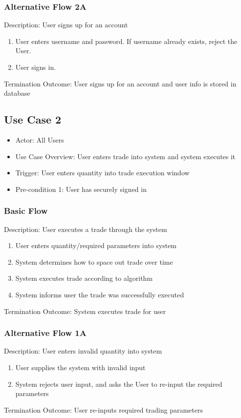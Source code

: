 \documentclass{article}
\begin{document}
\subsubsection{Alternative Flow 2A}
Description: User signs up for an account
\begin{enumerate}
\item User enters username and password. If username already exists, reject the User.
\item User signs in. 
\end{enumerate}
Termination Outcome: User signs up for an account and user info is stored in database

\subsection{Use Case 2}
\begin{itemize}
\item Actor: All Users
\item Use Case Overview:  User enters trade into system and system executes it
\item Trigger: User enters quantity into trade execution window
\item Pre-condition 1: User has securely signed in
\end{itemize}

\subsubsection{Basic Flow}
Description: User executes a trade through the system
\begin{enumerate}
\item User enters quantity/required parameters into system
\item System determines how to space out trade over time
\item System executes trade according to algorithm
\item System informs user the trade was successfully executed
\end{enumerate}
Termination Outcome: System executes trade for user

\subsubsection{Alternative Flow 1A}
Description: User enters invalid quantity into system
\begin{enumerate}
\item User supplies the system with invalid input
\item System rejects user input, and asks the User to re-input the required parameters
\end{enumerate}
Termination Outcome: User re-inputs required trading parameters
\end{document}
